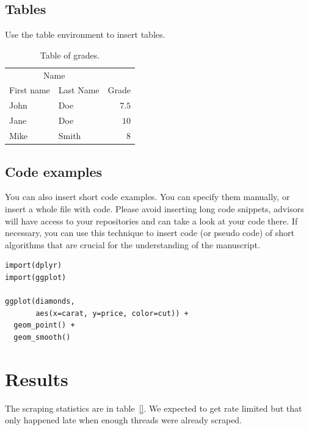 \documentclass[fleqn,moreauthors,10pt]{ds_report}
\begin{document}
\subsection*{Tables}

Use the table environment to insert tables.

\begin{table}[hbt]
	\caption{Table of grades.}
	\centering
	\begin{tabular}{l l | r}
		\toprule
		\multicolumn{2}{c}{Name} \\
		\cmidrule(r){1-2}
		First name & Last Name & Grade \\
		\midrule
		John & Doe & $7.5$ \\
		Jane & Doe & $10$ \\
		Mike & Smith & $8$ \\
		\bottomrule
	\end{tabular}
	\label{tab:label}
\end{table}


\subsection*{Code examples}

You can also insert short code examples. You can specify them manually, or insert a whole file with code. Please avoid inserting long code snippets, advisors will have access to your repositories and can take a look at your code there. If necessary, you can use this technique to insert code (or pseudo code) of short algorithms that are crucial for the understanding of the manuscript.

\lstset{language=Python}


\lstset{language=R}
\begin{lstlisting}
import(dplyr)
import(ggplot)

ggplot(diamonds,
	   aes(x=carat, y=price, color=cut)) +
  geom_point() +
  geom_smooth()
\end{lstlisting}

\fi
\section*{Results}
The scraping statistics are in table~\ref{}. We expected to get rate limited but that only happened late when enough threads were already scraped.
\end{document}
